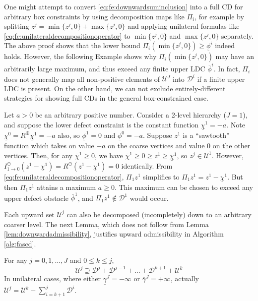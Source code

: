 \documentclass[review,hidelinks,onefignum,onetabnum]{siamart220329}
\newcommand{\maxR}{R^{\bm{\oplus}}}
\newcommand{\minR}{R^{\bm{\ominus}}}
\begin{document}
One might attempt to convert \eqref{eq:fe:downwardsuminclusion} into a full CD for arbitrary box constraints by using decomposition maps like $\Pi_i$, for example by splitting $z^j = \min\{z^j,0\} + \max\{z^j,0\}$ and applying unilateral formulas like \eqref{eq:fe:unilateraldecompositionoperator} to $\min\{z^j,0\}$ and $\max\{z^j,0\}$ separately.  The above proof shows that the lower bound $\Pi_i (\min\{z^j,0\}) \ge \underline{\phi}^i$ indeed holds.  However, the following Example shows why $\Pi_i(\min\{z^j,0\})$ may have an arbitrarily large maximum, and thus exceed any finite upper LDC $\overline{\phi}^i$.  In fact, $\Pi_i$ does not generally map all non-positive elements of $\mathcal{U}^J$ into $\mathcal{D}^i$ if a finite upper LDC is present.  On the other hand, we can not exclude entirely-different strategies for showing full CDs in the general box-constrained case.

\begin{example}  \label{ex:notfullcd}
Let $a > 0$ be an arbitrary positive number.  Consider a 2-level hierarchy ($J=1$), and suppose the lower defect constraint is the constant function $\underline{\chi}^1=-a$.  Note $\underline{\chi}^0=\maxR \underline{\chi}^1=-a$ also, so $\underline{\phi}^1=0$ and $\underline{\phi}^0=-a$.  Suppose $z^1$ is a ``sawtooth'' function which takes on value $-a$ on the coarse vertices and value $0$ on the other vertices.  Then, for any $\overline{\chi}^1\ge 0$, we have $\overline{\chi}^1 \ge 0 \ge z^1\ge \underline{\chi}^1$, so $z^j \in \mathcal{U}^1$.  However, $I_{1\to 0}^\ominus(z^1 - \underline{\chi}^1) = \minR(z^1 - \underline{\chi}^1) = 0$ identically.  From \eqref{eq:fe:unilateraldecompositionoperator}, $\Pi_1 z^1$ simplifies to $\Pi_1 z^1 = z^1 - \underline{\chi}^1$.  But then $\Pi_1 z^1$ attains a maximum $a\ge 0$.  This maximum can be chosen to exceed any upper defect obstacle $\overline{\phi}^1$, and $\Pi_1 z^1 \notin \mathcal{D}^1$ would occur.
\end{example}

Each upward set $\mathcal{U}^j$ can also be decomposed (incompletely) down to an arbitrary coarser level.  The next Lemma, which does not follow from Lemma \ref{lem:downwardadmissibility}, justifies upward admissibility in Algorithm \ref{alg:fascd}.

\begin{lemma}  \label{lem:upwardadmissibility}  For any $j=0,1,\dots,J$ and $0\le k\le j$,
\begin{equation}
\mathcal{U}^j \supseteq \mathcal{D}^j + \mathcal{D}^{j-1} + \dots + \mathcal{D}^{k+1} + \mathcal{U}^k \label{eq:fe:upwardsuminclusion}
\end{equation}
In unilateral cases, where either $\underline{\gamma}^J=-\infty$ or $\overline{\gamma}^J=+\infty$, actually $\mathcal{U}^j = \mathcal{U}^k + \sum_{i=k+1}^j \mathcal{D}^i$. \end{lemma}
\end{document}
